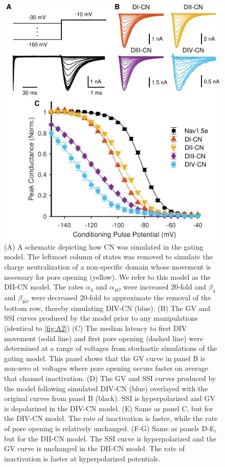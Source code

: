 \begin{figure}[t]
\begin{minipage}[c]{85mm}
    \includegraphics[width=\textwidth]{Figures/AppendixA/figure05.pdf}
\end{minipage}\hfill
\begin{minipage}[c]{80mm}
    \caption{
    (A) A schematic depicting how CN was simulated in the gating model. The leftmost column of states was removed to simulate the charge neutralization of a non-specific domain whose movement is necessary for pore opening (yellow). We refer to this model as the DII-CN model. The rates $\alpha_4$ and $\alpha_{4O}$ were increased 20-fold and $\beta_4$ and $\beta_{4O}$ were decreased 20-fold to approximate the removal of the bottom row, thereby simulating DIV-CN (blue).
    (B) The GV and SSI curves produced by the model prior to any manipulations (identical to \autoref{fig:A2})
    (C) The median latency to first DIV movement (solid line) and first pore opening (dashed line) were determined at a range of voltages from stochastic simulations of the gating model. This panel shows that the GV curve in panel B is non-zero at voltages where pore opening occurs faster on average that channel inactivation.
    (D) The GV and SSI curves produced by the model following simulated DIV-CN (blue) overlayed with the original curves from panel B (black). SSI is hyperpolarized and GV is depolarized in the DIV-CN model.
    (E) Same as panel C, but for the DIV-CN model. The rate of inactivation is faster, while the rate of pore opening is relatively unchanged. 
    (F-G) Same as panels D-E, but for the DII-CN model. The SSI curve is hyperpolarized and the GV curve is unchanged in the DII-CN model. The rate of inactivation is faster at hyperpolarized potentials.}
    \label{fig:A5}
\end{minipage}
\end{figure}

